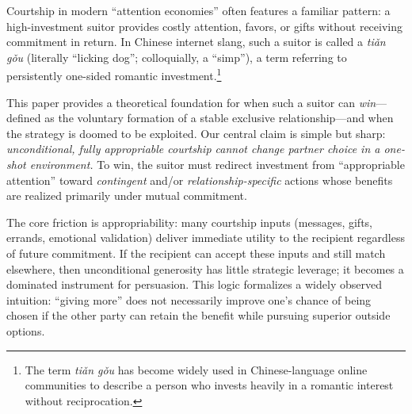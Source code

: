 \documentclass[AER]{AEA}
\begin{document}


Courtship in modern ``attention economies'' often features a familiar pattern:
a high-investment suitor provides costly attention, favors, or gifts without receiving commitment in return.
In Chinese internet slang, such a suitor is called a \emph{ti\v{a}n g\v{o}u} (literally ``licking dog''; colloquially, a ``simp''),
a term referring to persistently one-sided romantic investment.\footnote{The term \emph{ti\v{a}n g\v{o}u} has become widely used in Chinese-language online communities to describe a person who invests heavily in a romantic interest without reciprocation.}

This paper provides a theoretical foundation for when such a suitor can \emph{win}---defined as the voluntary formation of a stable exclusive relationship---and when the strategy is doomed to be exploited.
Our central claim is simple but sharp: \emph{unconditional, fully appropriable courtship cannot change partner choice in a one-shot environment.}
To win, the suitor must redirect investment from ``appropriable attention'' toward \emph{contingent} and/or \emph{relationship-specific} actions whose benefits are realized primarily under mutual commitment.

The core friction is appropriability:
many courtship inputs (messages, gifts, errands, emotional validation) deliver immediate utility to the recipient regardless of future commitment.
If the recipient can accept these inputs and still match elsewhere, then unconditional generosity has little strategic leverage; it becomes a dominated instrument for persuasion.
This logic formalizes a widely observed intuition: ``giving more'' does not necessarily improve one's chance of being chosen if the other party can retain the benefit while pursuing superior outside options.
\end{document}
